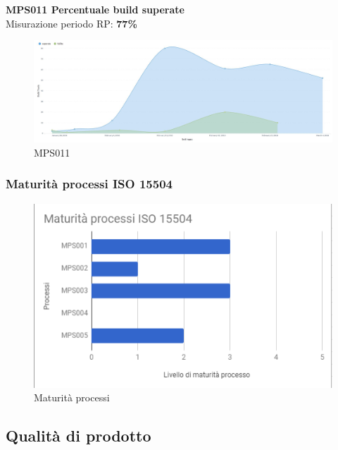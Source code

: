 \documentclass[PianoDiQualifica.tex]{subfiles}
\begin{document}
\newpage

\textbf{MPS011 Percentuale build superate}\\
Misurazione periodo RP: \textbf{77\%}
\begin{figure}[H]
	\centering
	\includegraphics[width=1\linewidth]{RP/MPS011}
	\caption{MPS011}
	\label{fig:processi}
\end{figure}

\subsubsection{Maturità processi ISO 15504}
\begin{figure}[H]
	\centering
	\includegraphics[width=0.7\linewidth]{RP/Processi}
	\caption{Maturità processi}
	\label{fig:processi}
\end{figure}


\newpage
\subsection{Qualità di prodotto}
\end{document}
